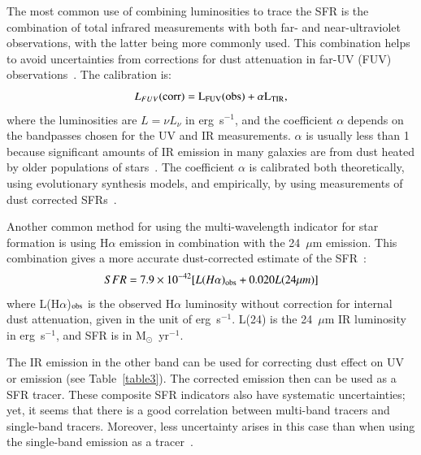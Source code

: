 The most common use of combining luminosities to trace the SFR is the combination of total infrared measurements with both far- and near-ultraviolet observations, with the latter being more commonly used. 
This combination helps to avoid uncertainties from corrections for dust attenuation in far-UV (FUV) observations~\citep[e.g.][]{Hao11}. The calibration is:
\begin{equation}
L_{FUV}(\rm corr) = L_{FUV}(\rm obs) + \alpha L_{\rm TIR},
\end{equation}
where the luminosities are $L = \nu L_{\nu}$ in erg~s$^{-1}$, and the coefficient $\alpha$ depends on the bandpasses chosen for the UV and IR measurements. $\alpha$ is usually less than 1 because significant amounts of IR emission in many galaxies are from dust heated by older populations of stars~\citep{Kennicutt12}. The coefficient $\alpha$ is calibrated both theoretically, using evolutionary synthesis models, and empirically, by using measurements of dust corrected SFRs~\citep[e.g.][]{Hao11, Leroy08}. 

Another common method for using the multi-wavelength indicator for star formation is using H${\alpha}$ emission in combination with the 24~$\mu$m emission. 
This combination gives a more accurate dust-corrected estimate of the SFR~\citep{Kennicutt09}:
\begin{equation} 
\label{equ: halphaplus24}
SFR = 7.9 \times 10^{-42}[L(H{\alpha})_{\rm obs} + 0.020L(24 \mu m)]
\end{equation}
where L(H${\alpha}$)$_{\rm obs}$ is the observed H${\alpha}$ luminosity without correction for internal dust attenuation, given in the unit of erg~s$^{-1}$. 
L(24) is the 24~$\mu$m IR luminosity in erg~s$^{-1}$, and SFR is in M$_{\odot}$~yr$^{-1}$.


The IR emission in the other band can be used for correcting dust effect on UV or \halpha emission (see Table~\ref{table3}). 
The corrected emission then can be used as a SFR tracer.
These composite SFR indicators also have systematic uncertainties; yet, it seems that there is a good correlation between multi-band tracers and single-band tracers. 
Moreover, less uncertainty arises in this case than when using the single-band emission as a tracer~\citep{Kennicutt09}. 


